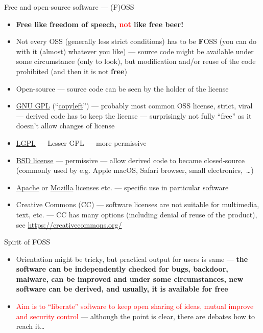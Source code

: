\documentclass[compress, ucs, xelatex, 11pt, xcolor=svgnames, aspectratio=169,
	hyperref={
		bookmarks=true,
		unicode=true,
		colorlinks=true,
		pdftitle={Linux, command line and MetaCentrum},
		plainpages=false,
		pdfauthor={Vojtech Zeisek},
		pdfsubject={Course about use of Linux command line, writing shell scripts and using MetaCentrum of CESNET},
		pdfcreator={XeLaTeX},
		pdfkeywords={Linux, GNU, BASH, shell, command line, MetaCentrum},
		linkcolor=DarkRed, %
		anchorcolor=DarkBlue, %
		citecolor=Indigo, %
		filecolor=NavyBlue, %
		menucolor=DarkMagenta, %
		urlcolor=DarkBlue, %
		pdftex},
	url={hyphens, lowtilde} %
	]{beamer}
\renewcommand{\alert}[1]{\textcolor{red}{#1}}
\begin{document}
\begin{frame}[allowframebreaks]{Free and open-source software --- (F)OSS}
	\begin{itemize}
		\item \textbf{Free like freedom of speech, \alert{not} like free beer!}
		\item Not every OSS (generally less strict conditions) has to be \textbf{F}OSS (you can do with it (almost) whatever you like) --- source code might be available under some circumstance (only to look), but modification and/or reuse of the code prohibited (and then it is not \textbf{free})
		\item Open-source --- source code can be seen by the holder of the license
		\item \href{https://www.gnu.org/licenses/gpl-3.0.html}{GNU GPL} (\enquote{\href{https://www.gnu.org/copyleft/}{copyleft}}) --- probably most common OSS license, strict, viral --- derived code has to keep the license --- surprisingly not fully \enquote{free} as it doesn't allow changes of license
		\item \href{https://www.gnu.org/licenses/lgpl-3.0.en.html}{LGPL} --- Lesser GPL --- more permissive
		\item \href{https://en.wikipedia.org/wiki/BSD_licenses}{BSD license} --- permissive --- allow derived code to became closed-source (commonly used by e.g. Apple macOS, Safari browser, small electronics,~\ldots)
		\item \href{https://www.apache.org/licenses/}{Apache} or \href{https://www.mozilla.org/MPL/}{Mozilla} licenses etc. --- specific use in particular software
		\item Creative Commons (CC) --- software licenses are not suitable for multimedia, text, etc. --- CC has many options (including denial of reuse of the product), see \url{https://creativecommons.org/}
	\end{itemize}
	\begin{block}{Spirit of FOSS}
		\begin{itemize}
			\item Orientation might be tricky, but practical output for users is same --- \textbf{the software can be independently checked for bugs, backdoor, malware, can be improved and under some circumstances, new software can be derived, and usually, it is available for free}
			\item \alert{Aim is to \enquote{liberate} software to keep open sharing of ideas, mutual improve and security control} --- although the point is clear, there are debates how to reach it\ldots

\end{itemize}
\end{block}
\end{frame}
\end{document}
